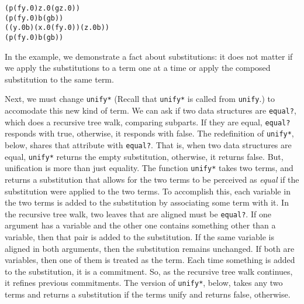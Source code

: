 \begin{alltt}
(p (f y.0) z.0 (g z.0))
(p (f y.0) b (g b))
((y.0 b) (x.0 (f y.0)) (z.0 b))
(p (f y.0) b (g b))
\end{alltt}

In the example, we demonstrate a fact about substitutions: it does not
matter if we apply the substitutions to a term one at a time or apply
the composed substitution to the same term.

Next, we must change \texttt{unify*} (Recall that \texttt{unify*} is
called from \texttt{unify}.) to accomodate this new kind of term.  We
can ask if two data structures are \texttt{equal?}, which does a
recursive tree walk, comparing subparts.  If they are equal,
\texttt{equal?} responds with true, otherwise, it responds with false.
The redefinition of \texttt{unify*}, below, shares that attribute with
\texttt{equal?}. That is, when two data structures are equal,
\texttt{unify*} returns the empty substitution, otherwise, it returns
false.  But, unification is more than just equality.  The function
\texttt{unify*} takes two terms, and returns a substitution that allows
for the two terms to be perceived as \emph{equal} if the substitution
were applied to the two terms.  To accomplish this, each variable in
the two terms is added to the substitution by associating some term
with it.  In the recursive tree walk, two leaves that are aligned must
be \texttt{equal?}.  If one argument has a variable and the other one
contains something other than a variable, then that pair is added to
the substitution.  If the same variable is aligned in both arguments,
then the substitution remains unchanged.  If both are variables, then
one of them is treated as the term.  Each time something is added to
the substitution, it is a commitment. So, as the recursive tree walk
continues, it refines previous commitments.
\newpage
The version of \texttt{unify*}, below, takes any two terms and returns a
substitution if the terms unify and returns false, otherwise.

